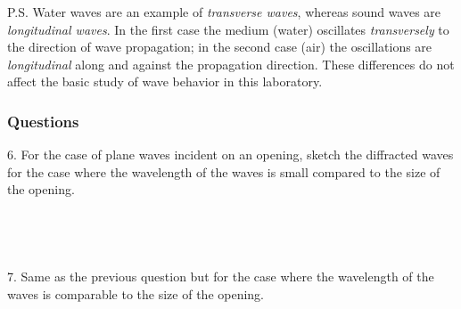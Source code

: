 \documentclass[11pt]{NSF}
\begin{document}
P.S. Water waves are an example of {\em transverse waves}, 
whereas sound waves are {\em longitudinal waves}. 
In the first case the medium (water) oscillates {\em transversely} to 
the direction of wave propagation; in the second case (air) the 
oscillations are {\em longitudinal} along and against the 
propagation direction. 
These differences do not affect the basic study of wave behavior in this laboratory.

\subsubsection*{Questions}

6. For the case of plane waves incident on an opening, sketch the 
diffracted waves for the case where the wavelength of the waves is 
small compared to the size of the opening.
\\
\\
\\
\\
\\

7. Same as the previous question but for the case where the 
wavelength of the waves is comparable to the size of the opening.
\end{document}
